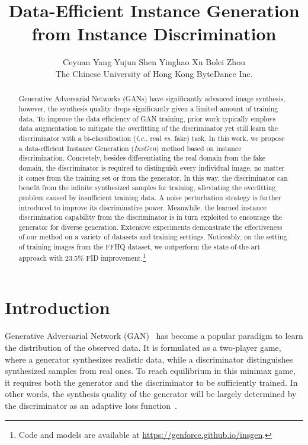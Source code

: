 \documentclass{article}
\title{Data-Efficient Instance Generation \\ from Instance Discrimination}
\author{
  Ceyuan Yang \quad
  Yujun Shen \quad
  Yinghao Xu \quad
  Bolei Zhou \\
  The Chinese University of Hong Kong \quad
  ByteDance Inc. \\
}
\begin{document}
\maketitle


\begin{abstract}
Generative Adversarial Networks (GANs) have significantly advanced image synthesis, however, the synthesis quality drops significantly given a limited amount of training data.
To improve the data efficiency of GAN training, prior work typically employs data augmentation to mitigate the overfitting of the discriminator yet still learn the discriminator with a bi-classification (\textit{i.e.}, real \textit{vs.} fake) task.
In this work, we propose a data-efficient Instance Generation (\textit{InsGen}) method based on instance discrimination.
Concretely, besides differentiating the real domain from the fake domain, the discriminator is required to distinguish every individual image, no matter it comes from the training set or from the generator.
In this way, the discriminator can benefit from the infinite synthesized samples for training, alleviating the overfitting problem caused by insufficient training data.
A noise perturbation strategy is further introduced to improve its discriminative power.
Meanwhile, the learned instance discrimination capability from the discriminator is in turn exploited to encourage the generator for diverse generation.
Extensive experiments demonstrate the effectiveness of our method on a variety of datasets and training settings.
Noticeably, on the setting of  training images from the FFHQ dataset, we outperform the state-of-the-art approach with 23.5\% FID improvement.\footnote{Code and models are available at \url{https://genforce.github.io/insgen}.}
\end{abstract}


\section{Introduction}\label{sec:intro}


Generative Adversarial Network (GAN)~\cite{goodfellow2014generative} has become a popular paradigm to learn the distribution of the observed data.
It is formulated as a two-player game, where a generator synthesizes realistic data, while a discriminator distinguishes synthesized samples from real ones.
To reach equilibrium in this minimax game, it requires both the generator and the discriminator to be sufficiently trained.
In other words, the synthesis quality of the generator will be largely determined by the discriminator as an adaptive loss function~\cite{karras2020training, tran2021data, zhao2020differentiable, zhao2020image}.
\end{document}
